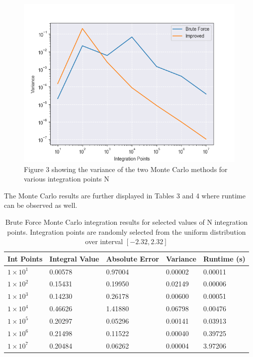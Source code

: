 \documentclass{emulateapj}
\begin{document}
\begin{figure}[H]
    \centering
    \includegraphics[scale=0.5]{montevariance.png}
    \caption{Figure 3 showing the variance of the two Monte Carlo methods for various integration points N}
    \label{fig:fig3}
\end{figure}
The Monte Carlo results are further displayed in Tables 3 and 4 where runtime can be observed as well.
\begin{table}[H]
\caption{Brute Force Monte Carlo integration results for selected values of N integration points. Integration points are randomly selected from the uniform distribution over interval $[-2.32,2.32]$}
\label{tab:table2}
\begin{ruledtabular}
\begin{tabular}{p{1.3cm} p{1.5cm} p{1.5cm}p{1.5cm} p{1.5cm} }
Int Points & Integral Value & Absolute Error & Variance & Runtime (s)\\
\hline
 $1\times10^{1}$ & 0.00578 & 0.97004 & 0.00002 & 0.00011\\
 $1\times10^{2}$ & 0.15431 & 0.19950 & 0.02149 & 0.00006\\
 $1\times10^{3}$ & 0.14230 & 0.26178 & 0.00600 & 0.00051\\
 $1\times10^{4}$ & 0.46626 & 1.41880 & 0.06798 & 0.00476\\
 $1\times10^{5}$ & 0.20297 & 0.05296 & 0.00141 & 0.03913\\
 $1\times10^{6}$ & 0.21498 & 0.11522 & 0.00040 & 0.39725\\
 $1\times10^{7}$ & 0.20484 & 0.06262 & 0.00004 & 3.97206\\
\end{tabular}
\end{ruledtabular}
\end{table}
\end{document}
